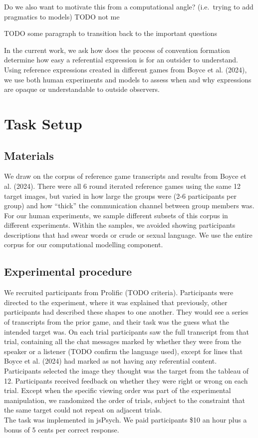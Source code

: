 \documentclass[10pt, letterpaper]{article}
\begin{document}
Do we also want to motivate this from a computational angle?
(i.e.~trying to add pragmatics to models) TODO not me

TODO some paragraph to transition back to the important questions

In the current work, we ask how does the process of convention formation
determine how easy a referential expression is for an outsider to
understand. Using reference expressions created in different games from
Boyce et al. (2024), we use both human experiments and models to assess
when and why expressions are opaque or understandable to outside
observers.

\section{Task Setup}\label{task-setup}

\subsection{Materials}\label{materials}

We draw on the corpus of reference game transcripts and results from
Boyce et al. (2024). There were all 6 round iterated reference games
using the same 12 target images, but varied in how large the groups were
(2-6 participants per group) and how ``thick'' the communication channel
between group members was. For our human experiments, we sample
different subsets of this corpus in different experiments. Within the
samples, we avoided showing participants descriptions that had swear
words or crude or sexual language. We use the entire corpus for our
computational modelling component.

\subsection{Experimental procedure}\label{experimental-procedure}

We recruited participants from Prolific (TODO criteria). Participants
were directed to the experiment, where it was explained that previously,
other participants had described these shapes to one another. They would
see a series of transcripts from the prior game, and their task was the
guess what the intended target was. On each trial participants saw the
full transcript from that trial, containing all the chat messages marked
by whether they were from the speaker or a listener (TODO confirm the
language used), except for lines that Boyce et al. (2024) had marked as
not having any referential content. Participants selected the image they
thought was the target from the tableau of 12. Participants received
feedback on whether they were right or wrong on each trial. Except when
the specific viewing order was part of the experimental manipulation, we
randomized the order of trials, subject to the constraint that the same
target could not repeat on adjacent trials.\\
The task was implemented in jsPsych. We paid participants \$10 an hour
plus a bonus of 5 cents per correct response.
\end{document}
